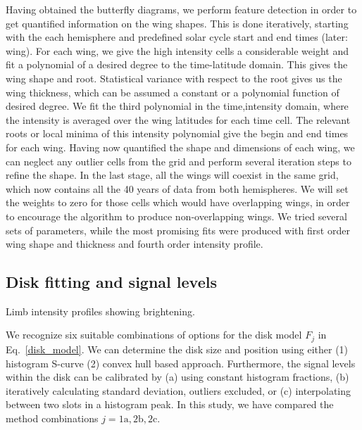\documentclass{aa}
\begin{document}
Having obtained the butterfly 
diagrams, we 
perform feature detection in order to get quantified information on the wing 
shapes. 
This is done iteratively, starting with the each hemisphere and predefined solar cycle start and end times 
(later: wing). For each wing, we give the high intensity cells a considerable weight and fit a polynomial of a desired 
degree to the time-latitude domain. This gives the wing shape and root. Statistical variance with respect to the root 
gives us the wing thickness, which can be assumed a constant or a polynomial function of desired degree. We fit the 
third polynomial in the time,intensity domain, where the intensity is averaged over the wing latitudes for each time 
cell. The relevant roots or local minima of this intensity polynomial give the begin and end times for each wing. Having 
now quantified the shape and dimensions of each wing, we can neglect any outlier cells from the grid and perform several 
iteration steps to refine the shape. In the last stage, all the wings will coexist in the same grid, which now contains 
all the 40 years of data from both hemispheres. We will set the weights to zero for those cells which would have 
overlapping wings, in order to encourage the algorithm to produce non-overlapping wings. We tried several sets of 
parameters, while the most promising fits were produced with first order wing shape and thickness and fourth order 
intensity profile.
\subsection{Disk fitting and signal levels} \label{sect:disk}Limb intensity profiles showing brightening. 

We recognize six suitable combinations of options for the disk model $F_j$ in 
Eq.~\ref{disk_model}. 
We can 
determine the disk size and position using either (1) histogram S-curve (2) convex hull based approach. Furthermore, the 
signal levels within the disk can be calibrated by (a) using constant histogram fractions, (b) iteratively calculating 
standard deviation, outliers excluded, or (c) interpolating between two slots in a histogram peak. In this study, we have compared the method 
combinations $j = \mathrm{1a}, \mathrm{2b}, \mathrm{2c}$.
\end{document}
